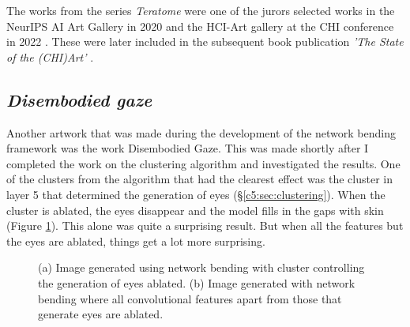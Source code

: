 The works from the series \textit{Teratome} were one of the jurors selected works in the NeurIPS AI Art Gallery in 2020 \citep{broad2020teratome} and the HCI-Art gallery at the CHI conference in 2022 \citep{perry2022art} . 
These were later included in the subsequent book publication \textit{'The State of the (CHI)Art'} \citep{sturdee2023chiart}. 

\subsection{\textit{Disembodied gaze}}
\label{c7:subsubsec:disembodied}

Another artwork that was made during the development of the network bending framework was the work Disembodied Gaze. 
This was made shortly after I completed the work on the clustering algorithm and investigated the results. 
One of the clusters from the algorithm that had the clearest effect was the cluster in layer 5 that determined the generation of eyes (\S \ref{c5:sec:clustering}). 
When the cluster is ablated, the eyes disappear and the model fills in the gaps with skin (Figure \ref{fig:c7:eyes-no-eyes}). 
This alone was quite a surprising result. But when all the features but the eyes are ablated, things get a lot more surprising. 

\begin{figure}[!htbp]
    \hfill
    \hfill
    \caption[Network bending eye cluster comparison]{(a) Image generated using network bending with cluster controlling the generation of eyes ablated. (b) Image generated with network bending where all convolutional features apart from those that generate eyes are ablated.}
    \label{fig:c7:eyes-no-eyes}
 \end{figure}

